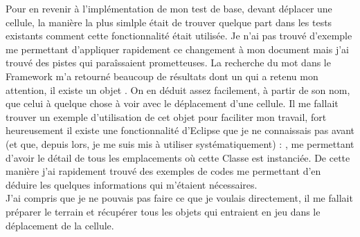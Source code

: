 Pour en revenir \`{a} l'impl\'{e}mentation de mon test de base, devant d\'{e}placer une cellule, la mani\`{e}re la plus simlple \'{e}tait de trouver quelque part dans les tests existants comment cette fonctionnalit\'{e} \'{e}tait utilis\'{e}e. Je n'ai pas trouv\'{e} d'exemple me permettant d'appliquer rapidement ce changement \`{a} mon document mais j'ai trouv\'{e} des pistes qui para\^{i}ssaient prometteuses. La recherche du mot  dans le \gls{Framework} m'a retourn\'{e} beaucoup de r\'{e}sultats dont un qui a retenu mon attention, il existe un objet . On en d\'{e}duit assez facilement, \`{a} partir de son nom, que celui \`{a} quelque chose \`{a} voir avec le d\'{e}placement d'une cellule. Il me fallait trouver un exemple d'utilisation de cet objet pour faciliter mon travail, fort heureusement il existe une fonctionnalit\'{e} d'\gls{Eclipse} que je ne connaissais pas avant (et que, depuis lors, je me suis mis \`{a} utiliser syst\'{e}matiquement) : , me permettant d'avoir le d\'{e}tail de tous les emplacements o\`{u} cette \gls{Classe} est instanci\'{e}e. De cette mani\`{e}re j'ai rapidement trouv\'{e} des exemples de codes me permettant d'en d\'{e}duire les quelques informations qui m'\'{e}taient n\'{e}cessaires.\\

J'ai compris que je ne pouvais pas faire ce que je voulais directement, il me fallait pr\'{e}parer le terrain et r\'{e}cup\'{e}rer tous les objets qui entraient en jeu dans le d\'{e}placement de la cellule.\\

